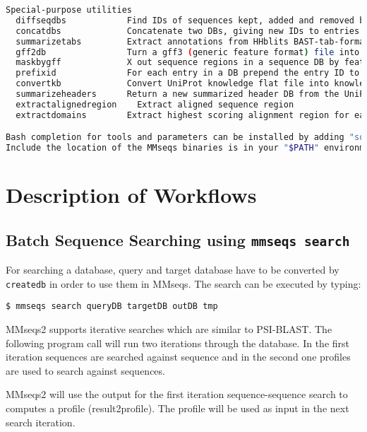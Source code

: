 \documentclass[11pt,a4paper]{scrreprt}
\begin{document}
\begin{lstlisting}[language=bash, basicstyle=\footnotesize]
Special-purpose utilities
  diffseqdbs            Find IDs of sequences kept, added and removed between two versions of sequence DB
  concatdbs             Concatenate two DBs, giving new IDs to entries from second input DB
  summarizetabs         Extract annotations from HHblits BAST-tab-formatted results
  gff2db                Turn a gff3 (generic feature format) file into a gff3 DB
  maskbygff             X out sequence regions in a sequence DB by features in a gff3 file
  prefixid              For each entry in a DB prepend the entry ID to the entry itself
  convertkb             Convert UniProt knowledge flat file into knowledge DB for the selected column types
  summarizeheaders      Return a new summarized header DB from the UniProt headers of a cluster DB
  extractalignedregion    Extract aligned sequence region
  extractdomains        Extract highest scoring alignment region for each sequence from BLAST-tab file

Bash completion for tools and parameters can be installed by adding "source path/to/mmseqs/util/bash-completion.sh" to your "$HOME/.bash_profile".
Include the location of the MMseqs binaries is in your "$PATH" environment variable.
\end{lstlisting}
\section{Description of Workflows}
\subsection{Batch Sequence Searching using \texttt{mmseqs search}}

For searching a database, query and target database have to be converted by \texttt{createdb} in order to use them in MMseqs. The search can be executed by typing:

\begin{verbatim}
$ mmseqs search queryDB targetDB outDB tmp
\end{verbatim}

MMseqs2 supports iterative searches which are similar to PSI-BLAST.   The following program call will run two iterations through the database. In the first iteration sequences  are searched against sequence and in the second one profiles are used to search against sequences.

MMseqs2 will use the output for the first iteration sequence-sequence search to computes a profile (result2profile). The profile will be used as input in the next search iteration. 
\end{document}
